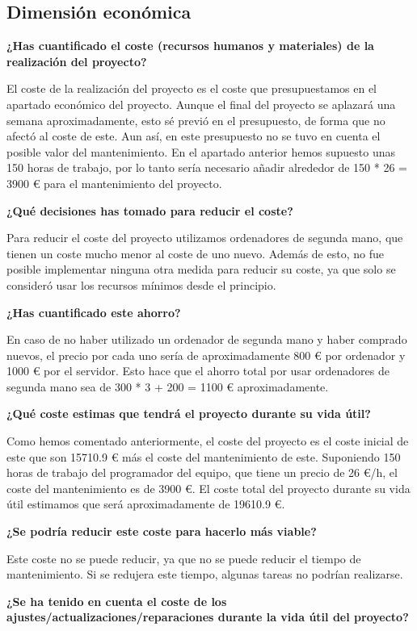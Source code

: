 \subsection{Dimensión económica}

\textbf{¿Has cuantificado el coste (recursos humanos y materiales) de la realización del proyecto?}

El coste de la realización del proyecto es el coste que presupuestamos en el apartado económico del proyecto. Aunque el final del proyecto se aplazará una semana aproximadamente, esto sé previó en el presupuesto, de forma que no afectó al coste de este. Aun así, en este presupuesto no se tuvo en cuenta el posible valor del mantenimiento. En el apartado anterior hemos supuesto unas 150 horas de trabajo, por lo tanto sería necesario añadir alrededor de 150 * 26 = 3900 € para el mantenimiento del proyecto.

\textbf{¿Qué decisiones has tomado para reducir el coste?}

Para reducir el coste del proyecto utilizamos ordenadores de segunda mano, que tienen un coste mucho menor al coste de uno nuevo. Además de esto, no fue posible implementar ninguna otra medida para reducir su coste, ya que solo se consideró usar los recursos mínimos desde el principio.

\textbf{¿Has cuantificado este ahorro?}

En caso de no haber utilizado un ordenador de segunda mano y haber comprado nuevos, el precio por cada uno sería de aproximadamente 800 € por ordenador y 1000 € por el servidor. Esto hace que el ahorro total por usar ordenadores de segunda mano sea de 300 * 3 + 200 = 1100 € aproximadamente.

\textbf{¿Qué coste estimas que tendrá el proyecto durante su vida útil?}

Como hemos comentado anteriormente, el coste del proyecto es el coste inicial de este que son 15710.9 € más el coste del mantenimiento de este. Suponiendo 150 horas de trabajo del programador del equipo, que tiene un precio de 26 €/h, el coste del mantenimiento es de 3900 €. El coste total del proyecto durante su vida útil estimamos que será aproximadamente de 19610.9 €.

\textbf{¿Se podría reducir este coste para hacerlo más viable?}

Este coste no se puede reducir, ya que no se puede reducir el tiempo de mantenimiento. Si se redujera este tiempo, algunas tareas no podrían realizarse.

\textbf{¿Se ha tenido en cuenta el coste de los ajustes/actualizaciones/reparaciones durante la vida útil del proyecto?}

